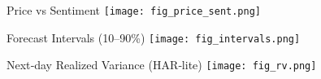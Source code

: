\documentclass[11pt]{beamer}
\begin{document}
\begin{frame}{Price vs Sentiment}
  \centering
  \texttt{[image: fig\_price\_sent.png]}
\end{frame}

\begin{frame}{Forecast Intervals (10--90\%)}
  \centering
  \texttt{[image: fig\_intervals.png]}
\end{frame}

\begin{frame}{Next‑day Realized Variance (HAR‑lite)}
  \centering
  \texttt{[image: fig\_rv.png]}
\end{frame}
\end{document}
